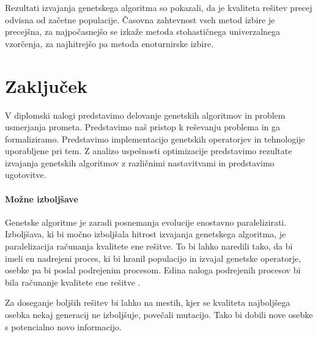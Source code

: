\documentclass[a4paper, 12pt]{book}
\begin{document}
Rezultati izvajanja genetskega algoritma so pokazali, da je kvaliteta re\v sitev precej odvisna od za\v cetne populacije.
\v Casovna zahtevnost vseh metod izbire je precej\v sna, za najpo\v casnej\v so se izka\v ze metoda stohasti\v cnega univerzalnega vzor\v cenja, za najhitrej\v so pa metoda enoturnirske izbire.

\chapter{Zaklju\v cek}
V diplomski nalogi predstavimo delovanje genetskih algoritmov in problem usmerjanja prometa.
Predstavimo na\v s pristop k re\v sevanju problema in ga formaliziramo. Predstavimo implementacijo genetskih operatorjev in tehnologije uporabljene pri tem. Z analizo uspe\v snosti optimizacije predstavimo rezultate izvajanja genetskih algoritmov z razli\v cnimi nastavitvami in predstavimo ugotovitve. 

\subsubsection{Mo\v zne izbolj\v save}

Genetske algoritme je zaradi posnemanja evolucije enostavno paralelizirati. Izbolj\v sava, ki bi mo\v cno izbolj\v sala hitrost izvajanja genetskega algoritma, je paralelizacija ra\v cunanja kvalitete ene re\v sitve. To bi lahko naredili tako, da bi imeli en nadrejeni proces, ki bi hranil populacijo in izvajal genetske operatorje, osebke pa bi poslal podrejenim procesom. Edina naloga podrejenih procesov bi bila ra\v cunanje kvalitete ene re\v sitve
\cite{uc3m}.

Za doseganje bolj\v sih re\v sitev bi lahko na mestih, kjer se kvaliteta najbolj\v sega osebka nekaj generacij ne izbolj\v suje, pove\v cali mutacijo. Tako bi dobili nove osebke s potencialno novo informacijo.
\end{document}
